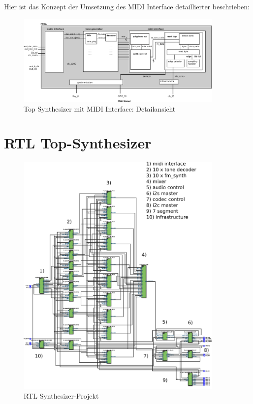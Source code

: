 Hier ist das Konzept der Umsetzung des MIDI Interface detaillierter beschrieben:

\begin{figure}[H]
	\includegraphics[width=0.9\textwidth]{images/midi_interface/top_synthesizer_detail_scaled.png}
	\caption{Top Synthesizer mit MIDI Interface: Detailansicht}
	\label{fig.top_synthesizer_detail}
\end{figure}

\chapter{RTL Top-Synthesizer}\label{chap.anhang_rtl_top_synthesizer}

\begin{figure}[H]
	\includegraphics[width=0.9\textwidth]{images/midi_interface/RTL_10_Decoder_Mixwer.png}
	\caption{RTL Synthesizer-Projekt}
	\label{fig.rtl_top_synthesizer}
\end{figure}
